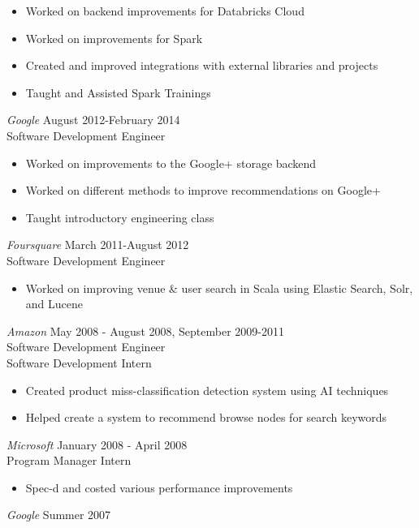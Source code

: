 \documentclass[10pt,line,margin=0.1]{newsres}
\begin{document}
\begin{resume}
\begin{itemize}
          \item Worked on backend improvements for Databricks Cloud
          \item Worked on improvements for Spark
          \item Created and improved integrations with external libraries and projects
          \item Taught and Assisted Spark Trainings
        \end{itemize}
        {\sl Google} \hfill August 2012-February 2014\\
        Software Development Engineer
        \begin{itemize}  \itemsep -2pt %
          \item Worked on improvements to the Google+ storage backend
          \item Worked on different methods to improve recommendations on Google+
          \item Taught introductory engineering class
        \end{itemize}
        {\sl Foursquare} \hfill March 2011-August 2012\\
        Software Development Engineer
        \begin{itemize}  \itemsep -2pt %
        \item Worked on improving venue \& user search in Scala using Elastic Search, Solr, and Lucene
        \end{itemize}
        {\sl Amazon} \hfill            May 2008 - August 2008, September 2009-2011 \\
        Software Development Engineer \\
        Software Development Intern
        \begin{itemize}  \itemsep -2pt %
        \item Created product miss-classification detection system using AI techniques
        \item Helped create a system to recommend browse nodes for search keywords
        \end{itemize} 
        {\sl Microsoft} \hfill        January 2008 - April 2008 \\
        Program Manager Intern
        \begin{itemize}
        \item Spec-d and costed various performance improvements
        \end{itemize} 
        {\sl Google} \hfill        Summer 2007 \\

\end{resume}
\end{document}
